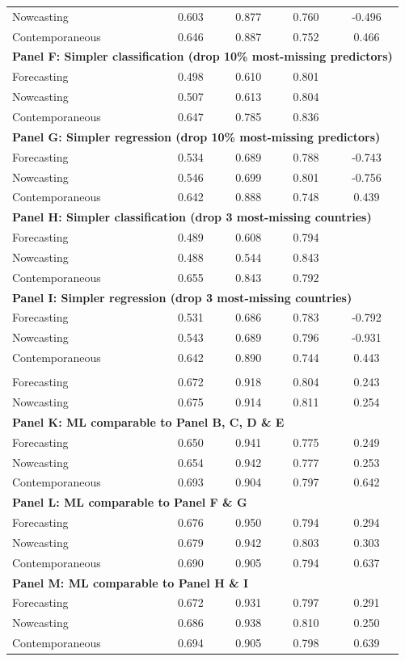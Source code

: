 \documentclass[pdflatex,sn-mathphys-num]{sn-jnl}%
\theoremstyle{thmstyleone}%
\theoremstyle{thmstyletwo}%
\theoremstyle{thmstylethree}%
\begin{document}
\begin{longtable}{lcccc}
Nowcasting &  0.603  & 0.877 & 0.760    & -0.496   \\
Contemporaneous &  0.646 & 0.887 & 0.752    & 0.466    \\
\multicolumn{5}{l}{\textbf{Panel F: Simpler classification (drop 10\% most-missing predictors)} }\\ 
Forecasting	&	0.498&	0.610 &	0.801   	 	\\
Nowcasting	&	0.507&	0.613  &	0.804 	 	\\
Contemporaneous	&	0.647 &	0.785 &	0.836 \\
\multicolumn{5}{l}{\textbf{Panel G: Simpler regression (drop 10\% most-missing predictors)}} \\
Forecasting	&	0.534 & 	0.689&	0.788  	&-0.743   \\
Nowcasting	&	0.546 &	0.699&	0.801  &	-0.756   \\
Contemporaneous	&	0.642 &	0.888 &	0.748 &	0.439 \\
\multicolumn{5}{l}{\textbf{Panel H: Simpler classification (drop 3 most-missing countries)} }\\ 
Forecasting	&	0.489 	&	0.608& 0.794  	\\
Nowcasting	&	0.488 &	0.544 &	0.843  	\\
Contemporaneous	&	0.655 &	0.843&	0.792 	\\
\multicolumn{5}{l}{\textbf{Panel I: Simpler regression (drop 3 most-missing countries)}} \\
Forecasting	&	0.531  &	0.686&	0.783 	& -0.792  \\
Nowcasting	&	0.543 &	0.689&	0.796  &	-0.931  \\
Contemporaneous	&	0.642&	0.890 &	0.744  &	0.443 \\ \pagebreak
\multicolumn{5}{l}{\textbf{Panel J: ML comparable to Panel A: persistence baseline}}  \\
Forecasting & 0.672 & 0.918  & 0.804 &  0.243 \\
Nowcasting & 0.675& 0.914 & 0.811 & 0.254 \\
\multicolumn{5}{l}{\textbf{Panel K: ML comparable to Panel B, C, D \& E}}\\
Forecasting &  0.650 & 0.941 & 0.775 & 0.249 \\ 
Nowcasting & 0.654 & 0.942 & 0.777 & 0.253 \\
Contemporaneous &  0.693  & 0.904 & 0.797   & 0.642  \\
\multicolumn{5}{l}{\textbf{Panel L: ML comparable to Panel F \& G}}\\
Forecasting	&	0.676 & 0.950&	0.794 	 &	0.294 \\
Nowcasting	&	0.679&	0.942 &	0.803  &	0.303 \\
Contemporaneous	&	0.690 &	0.905 &	0.794  &	0.637 \\
\multicolumn{5}{l}{\textbf{Panel M: ML comparable to Panel H \& I}}\\
Forecasting	&	0.672 &		0.931 & 0.797  &	0.291\\ 
Nowcasting	&	0.686  &	0.938 &	0.810 &	0.250\\ 
Contemporaneous	&	0.694 &	0.905 &	0.798  &	0.639 
\\
\end{longtable}
\end{document}
